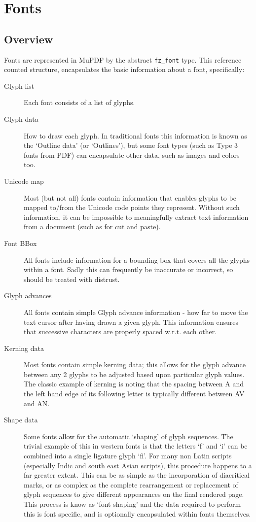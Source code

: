 \documentclass[oneside]{book}
\begin{document}
\chapter{Fonts}
\label{Fonts}

\section{Overview}

Fonts are represented in MuPDF by the abstract \texttt{fz\_font} type. This reference counted structure, encapsulates the basic information about a font, specifically:

\begin{description}
\item[Glyph list]Each font consists of a list of glyphs.
\item[Glyph data]How to draw each glyph. In traditional fonts this information is known as the `Outline data' (or `Outlines'), but some font types (such as Type 3 fonts from PDF) can encapsulate other data, such as images and colors too.
\item[Unicode map]Most (but not all) fonts contain information that enables glyphs to be mapped to/from the Unicode code points they represent. Without such information, it can be impossible to meaningfully extract text information from a document (such as for cut and paste).
\item[Font BBox]All fonts include information for a bounding box that covers all the glyphs within a font. Sadly this can frequently be inaccurate or incorrect, so should be treated with distrust.
\item[Glyph advances]All fonts contain simple Glyph advance information - how far to move the text cursor after having drawn a given glyph. This information ensures that successive characters are properly spaced w.r.t. each other.
\item[Kerning data]Most fonts contain simple kerning data; this allows for the glyph advance between any 2 glyphs to be adjusted based upon particular glyph values. The classic example of kerning is noting that the spacing between A and the left hand edge of its following letter is typically different between AV and AN.
\item[Shape data]Some fonts allow for the automatic `shaping' of glyph sequences. The trivial example of this in western fonts is that the letters `f' and `i' can be combined into a single ligature glyph `fi'. For many non Latin scripts (especially Indic and south east Asian scripts), this procedure happens to a far greater extent. This can be as simple as the incorporation of diacritical marks, or as complex as the complete rearrangement or replacement of glyph sequences to give different appearances on the final rendered page. This process is know as `font shaping' and the data required to perform this is font specific, and is optionally encapsulated within fonts themselves.
\end{description}
\end{document}
